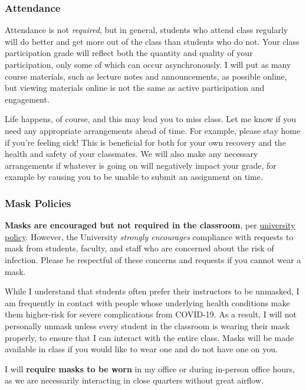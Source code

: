 \documentclass[
  letterpaper,
  DIV=11,
  numbers=noendperiod]{scrartcl}
\begin{document}
\hypertarget{attendance}{%
\subsubsection{Attendance}\label{attendance}}

Attendance is not \emph{required}, but in general, students who attend
class regularly will do better and get more out of the class than
students who do not. Your class participation grade will reflect both
the quantity and quality of your participation, only some of which can
occur asynchronously. I will put as many course materials, such as
lecture notes and announcements, as possible online, but viewing
materials online is not the same as active participation and engagement.

Life happens, of course, and this may lead you to miss class. Let me
know if you need any appropriate arrangements ahead of time. For
example, please stay home if you're feeling sick! This is beneficial for
both for your own recovery and the health and safety of your classmates.
We will also make any necessary arrangements if whatever is going on
will negatively impact your grade, for example by causing you to be
unable to submit an assignment on time.

\hypertarget{mask-policies}{%
\subsubsection{Mask Policies}\label{mask-policies}}

\textbf{Masks are encouraged but not required in the classroom}, per
\href{https://covid.cornell.edu/updates/20220727-students-fall-semester.cfm}{university
policy}. However, the University \emph{strongly encourages} compliance
with requests to mask from students, faculty, and staff who are
concerned about the risk of infection. Please be respectful of these
concerns and requests if you cannot wear a mask.

While I understand that students often prefer their instructors to be
unmasked, I am frequently in contact with people whose underlying health
conditions make them higher-risk for severe complications from COVID-19.
As a result, I will not personally unmask unless every student in the
classroom is wearing their mask properly, to ensure that I can interact
with the entire class. Masks will be made available in class if you
would like to wear one and do not have one on you.

I will \textbf{require masks to be worn} in my office or during
in-person office hours, as we are necessarily interacting in close
quarters without great airflow.
\end{document}
